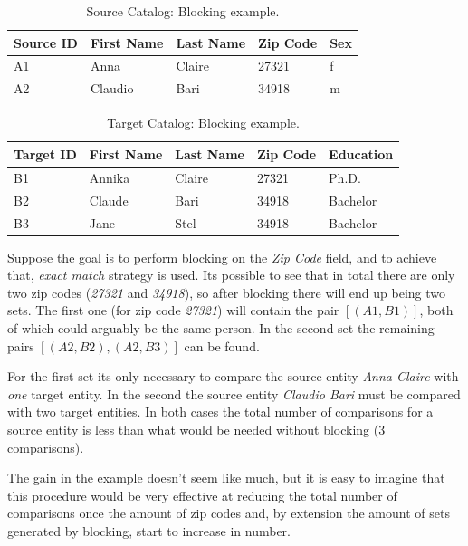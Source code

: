 \documentclass[epsfig,a4paper,11pt,titlepage,twoside,openany]{book}
\begin{document}
\begin{table}[H]
  \centering
  \begin{tabular}{l|l|l|l|l}
    Source ID & First Name & Last Name & Zip Code & Sex \\ \hline
    A1        & Anna       & Claire    & 27321    & f   \\
    A2        & Claudio    & Bari      & 34918    & m  
  \end{tabular}
  \caption{Source Catalog: Blocking example.}
  \label{tab:blocking-ex-source}
\end{table}

\begin{table}[H]
  \centering
  \begin{tabular}{l|l|l|l|l}
    Target ID & First Name & Last Name & Zip Code & Education \\ \hline
    B1        & Annika     & Claire    & 27321    & Ph.D.     \\
    B2        & Claude     & Bari      & 34918    & Bachelor  \\
    B3        & Jane       & Stel      & 34918    & Bachelor 
  \end{tabular}
  \caption{Target Catalog: Blocking example.}
  \label{tab:blocking-ex-target}
\end{table}

Suppose the goal is to perform blocking on the \textit{Zip Code} field, and to achieve that, 
\textit{exact match} strategy is used. Its possible to see that in total there are only two zip
codes (\textit{27321} and \textit{34918}), so after blocking there will end up being two sets. The first one (for zip code \textit{27321}) will contain the pair
$[(A1, B1)]$, both of which could arguably be the same person. In the second set the remaining pairs $[(A2, B2), (A2, B3)]$ can be found.

For the first set its only necessary to compare the source entity \textit{Anna Claire}
with \textit{one} target entity. In the second the
source entity \textit{Claudio Bari} must be compared with two target entities. In both cases the
total number of comparisons for a source entity is less than what would be needed
without blocking (3 comparisons).

The gain in the example doesn't seem like much, but it is easy to imagine that
this procedure would be very effective at reducing the total number of
comparisons once the amount of zip codes and, by extension the amount of sets
generated by blocking, start to increase in number.
\end{document}
